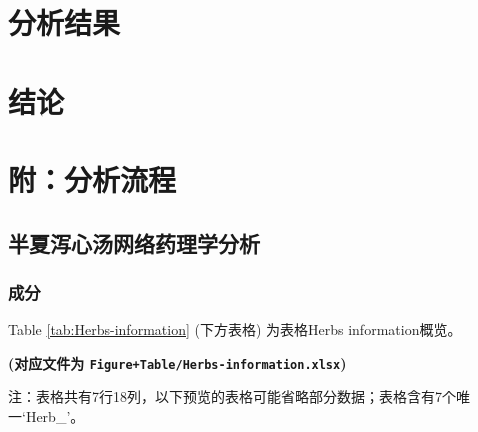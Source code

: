 \documentclass[
]{article}
\begin{document}
\hypertarget{results}{%
\section{分析结果}\label{results}}

\hypertarget{dis}{%
\section{结论}\label{dis}}

\hypertarget{workflow}{%
\section{附：分析流程}\label{workflow}}

\hypertarget{ux534aux590fux6cfbux5fc3ux6c64ux7f51ux7edcux836fux7406ux5b66ux5206ux6790}{%
\subsection{半夏泻心汤网络药理学分析}\label{ux534aux590fux6cfbux5fc3ux6c64ux7f51ux7edcux836fux7406ux5b66ux5206ux6790}}

\hypertarget{ux6210ux5206}{%
\subsubsection{成分}\label{ux6210ux5206}}

Table \ref{tab:Herbs-information} (下方表格) 为表格Herbs information概览。

\textbf{(对应文件为 \texttt{Figure+Table/Herbs-information.xlsx})}

\begin{center}\begin{tcolorbox}[colback=gray!10, colframe=gray!50, width=0.9\linewidth, arc=1mm, boxrule=0.5pt]注：表格共有7行18列，以下预览的表格可能省略部分数据；表格含有7个唯一`Herb\_'。
\end{tcolorbox}
\end{center}
\end{document}
